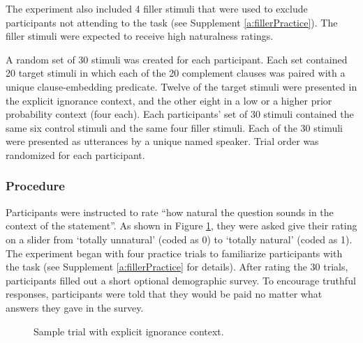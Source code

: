 \documentclass[11pt,fleqn]{article}
\newcommand{\6}{\mbox{$[\hspace*{-.6mm}[$}}
\newcommand{\9}{\mbox{$]\hspace*{-.6mm}]$}}
\begin{document}
The experiment also included 4 filler stimuli that were used to exclude participants not attending to the task (see Supplement \ref{a:fillerPractice}). The filler stimuli were expected to receive high naturalness ratings.

A random set of 30 stimuli was created for each participant. Each set contained 20 target stimuli in which each of the 20 complement clauses was paired with a unique clause-embedding predicate. Twelve of the target stimuli were presented in the explicit ignorance context, and the other eight in a low or a higher prior probability context (four each). Each participants' set of 30 stimuli contained the same six control stimuli and the same four filler stimuli. Each of the 30 stimuli were presented as utterances by a unique named speaker. Trial order was randomized for each participant. 

\subsubsection{Procedure}

Participants were instructed to rate ``how natural the question sounds in the context of the statement''. As shown in Figure \ref{f:trials}, they were asked give their rating on a slider from `totally unnatural' (coded as 0) to `totally natural' (coded as 1). The experiment began with four practice trials to familiarize participants with the task (see Supplement \ref{a:fillerPractice} for details). After rating the 30 trials, participants filled out a short optional demographic survey. To encourage truthful responses, participants were told that they would be paid no matter what answers they gave in the survey.


\begin{figure}[h]
\centering
\caption{Sample trial with explicit ignorance context.}\label{f:trials}
\end{figure}
\end{document}
